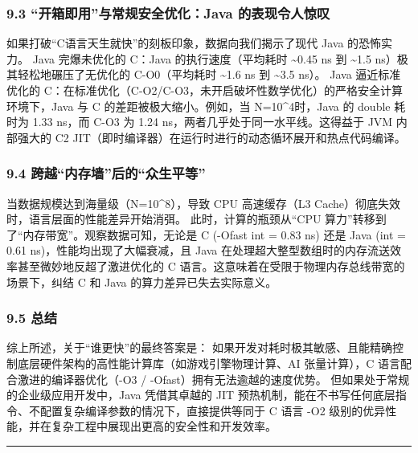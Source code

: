 \documentclass[12pt,fontset=none]{ctexart}
\begin{document}
\subsubsection{9.3 ``开箱即用''与常规安全优化：Java
的表现令人惊叹}\label{93-ux5f00ux7bb1ux5373ux7528ux4e0eux5e38ux89c4ux5b89ux5168ux4f18ux5316java-ux7684ux8868ux73b0ux4ee4ux4ebaux60caux53f9}

如果打破``C语言天生就快''的刻板印象，数据向我们揭示了现代 Java
的恐怖实力。 Java 完爆未优化的 C：Java 的执行速度（平均耗时
\textasciitilde0.45 ns 到 \textasciitilde1.5
ns）极其轻松地碾压了无优化的 C-O0（平均耗时 \textasciitilde1.6 ns 到
\textasciitilde3.5 ns）。 Java 逼近标准优化的
C：在标准优化（C-O2/C-O3，未开启破坏性数学优化）的严格安全计算环境下，Java
与 C 的差距被极大缩小。例如，当 N=10\^{}4时，Java 的 double 耗时为 1.33
ns，而 C-O3 为 1.24 ns，两者几乎处于同一水平线。这得益于 JVM 内部强大的
C2 JIT（即时编译器）在运行时进行的动态循环展开和热点代码编译。

\subsubsection{9.4
跨越``内存墙''后的``众生平等''}\label{94-ux8de8ux8d8aux5185ux5b58ux5899ux540eux7684ux4f17ux751fux5e73ux7b49}

当数据规模达到海量级（N=10\^{}8），导致 CPU 高速缓存（L3
Cache）彻底失效时，语言层面的性能差异开始消弭。 此时，计算的瓶颈从``CPU
算力''转移到了``内存带宽''。观察数据可知，无论是 C (-Ofast int = 0.83
ns) 还是 Java (int = 0.61 ns)，性能均出现了大幅衰减，且 Java
在处理超大整型数组时的内存流送效率甚至微妙地反超了激进优化的 C
语言。这意味着在受限于物理内存总线带宽的场景下，纠结 C 和 Java
的算力差异已失去实际意义。

\subsubsection{9.5 总结}\label{95-ux603bux7ed3}

综上所述，关于``谁更快''的最终答案是：
如果开发对耗时极其敏感、且能精确控制底层硬件架构的高性能计算库（如游戏引擎物理计算、AI
张量计算），C 语言配合激进的编译器优化（-O3 /
-Ofast）拥有无法逾越的速度优势。 但如果处于常规的企业级应用开发中，Java
凭借其卓越的 JIT
预热机制，能在不书写任何底层指令、不配置复杂编译参数的情况下，直接提供等同于
C 语言 -O2 级别的优异性能，并在复杂工程中展现出更高的安全性和开发效率。

\begin{center}\rule{0.5\linewidth}{0.5pt}\end{center}
\end{document}
